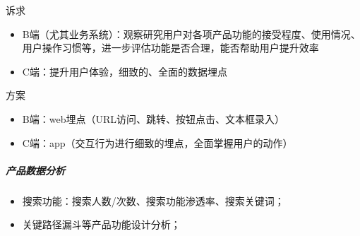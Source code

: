 \documentclass[letterpaper,11pt,english]{sphinxmanual}
\begin{document}

诉求
\begin{itemize}
\item {} 
B端（尤其业务系统）：观察研究用户对各项产品功能的接受程度、使用情况、用户操作习惯等，进一步评估功能是否合理，能否帮助用户提升效率

\item {} 
C端：提升用户体验，细致的、全面的数据埋点

\end{itemize}

方案
\begin{itemize}
\item {} 
B端：web埋点（URL访问、跳转、按钮点击、文本框录入）

\item {} 
C端：app（交互行为进行细致的埋点，全面掌握用户的动作）

\end{itemize}


\subparagraph{产品数据分析}
\label{\detokenize{chapter_skill/data_analysis:id8}}\begin{itemize}
\item {} 
搜索功能：搜索人数/次数、搜索功能渗透率、搜索关键词；

\item {} 
关键路径漏斗等产品功能设计分析；

\end{itemize}
\end{document}
